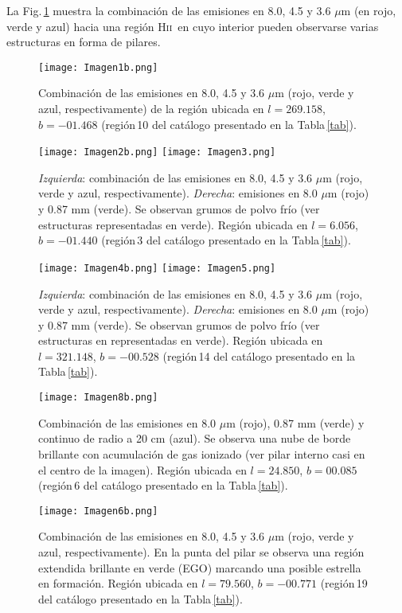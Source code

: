 \documentclass[baaa]{baaa}
\newcommand{\hii}{H\textsc{ii}}
\begin{document}
La Fig.\,\ref{figura1} muestra la combinación de las emisiones en 8.0, 4.5 y 3.6 \(\mu\)m (en rojo, verde y azul) hacia una región \hii~en cuyo interior pueden observarse varias estructuras en forma de pilares. 

\begin{figure}[h]
\centering
\texttt{[image: Imagen1b.png]}
\caption{Combinación de las emisiones en 8.0, 4.5 y 3.6 \(\mu\)m (rojo, verde y azul, respectivamente) de la región ubicada en $l=269.158$, $b=-01.468$ (región\,10 del catálogo presentado en la Tabla\,\ref{tab}).}
\label{figura1}
\end{figure}

\begin{figure}[h]
\texttt{[image: Imagen2b.png]}
\texttt{[image: Imagen3.png]}
\caption{{\it Izquierda}: combinación de las emisiones en 8.0, 4.5 y 3.6 \(\mu\)m (rojo, verde y azul, respectivamente).
{\it Derecha}: emisiones en 8.0 \(\mu\)m (rojo) y 0.87 mm (verde). 
Se observan grumos de polvo frío (ver estructuras representadas en verde). Región ubicada en $l=6.056$, $b=-01.440$ (región\,3 del catálogo presentado en la Tabla\,\ref{tab}).}
\label{figura2}
\end{figure}


\begin{figure}[h]
\texttt{[image: Imagen4b.png]}
\texttt{[image: Imagen5.png]}
\caption{{\it Izquierda}: combinación de las emisiones en 8.0, 4.5 y 3.6 \(\mu\)m (rojo, verde y azul, respectivamente).
{\it Derecha}: emisiones en 8.0 \(\mu\)m (rojo) y 0.87 mm (verde). Se observan grumos de polvo frío (ver estructuras en representadas en verde). Región ubicada en $l=321.148$, $b=-00.528$ (región\,14 del catálogo presentado en la Tabla\,\ref{tab}).}
\label{figura3}
\end{figure}


\begin{figure}[h]
\centering
\texttt{[image: Imagen8b.png]}
\caption{Combinación de las emisiones en 8.0 \(\mu\)m (rojo), 0.87 mm (verde) y continuo de radio a 20 cm (azul). Se observa una nube de borde brillante con acumulación de gas ionizado (ver pilar interno casi en el centro de la imagen). Región ubicada en $l=24.850$, $b=00.085$ (región\,6 del catálogo presentado en la Tabla\,\ref{tab}).  }
\label{figura4}
\end{figure}

\begin{figure}[h]
\centering
\texttt{[image: Imagen6b.png]}
\caption{Combinación de las emisiones en 8.0, 4.5 y 3.6 \(\mu\)m (rojo, verde y azul, respectivamente). En la punta del pilar se observa una región extendida brillante en verde (EGO) marcando una posible estrella en formación. Región ubicada en $l=79.560$, $b=-00.771$ (región\,19 del catálogo presentado en la Tabla\,\ref{tab}). }
\label{figura5}
\end{figure}
\end{document}
